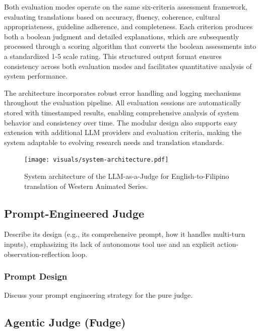 \documentclass[conference]{IEEEtran}
\begin{document}
Both evaluation modes operate on the same six-criteria assessment framework, evaluating translations based on accuracy, fluency, coherence, cultural appropriateness, guideline adherence, and completeness. Each criterion produces both a boolean judgment and detailed explanations, which are subsequently processed through a scoring algorithm that converts the boolean assessments into a standardized 1-5 scale rating. This structured output format ensures consistency across both evaluation modes and facilitates quantitative analysis of system performance.

The architecture incorporates robust error handling and logging mechanisms throughout the evaluation pipeline. All evaluation sessions are automatically stored with timestamped results, enabling comprehensive analysis of system behavior and consistency over time. The modular design also supports easy extension with additional LLM providers and evaluation criteria, making the system adaptable to evolving research needs and translation standards.

\begin{figure}[htbp]
\centering
\texttt{[image: visuals/system-architecture.pdf]}
\caption{System architecture of the LLM-as-a-Judge for English-to-Filipino translation of Western Animated Series.}
\label{fig:system_architecture}
\end{figure}

\subsection{Prompt-Engineered Judge}

Describe its design (e.g., its comprehensive prompt, how it handles multi-turn inputs), emphasizing its lack of autonomous tool use and an explicit action-observation-reflection loop.

\subsubsection{Prompt Design}

Discuss your prompt engineering strategy for the pure judge.

\subsection{Agentic Judge (Fudge)}
\end{document}
